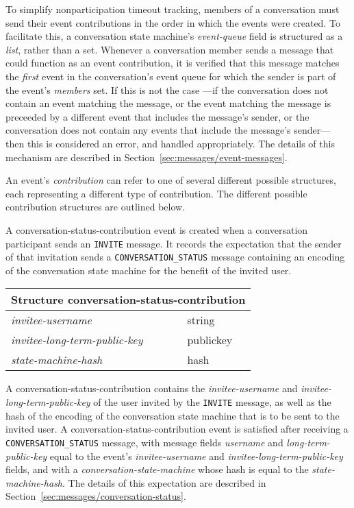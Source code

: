 \documentclass{article}
\def\npmessage#1{\texttt{#1}}
\def\field#1{\textit{#1}}
\def\smfield#1{\textsl{#1}}
\def\type#1{\textsf{#1}}
\newenvironment{struct}[1]{
\newcommand{\structfield}[2]{
\smfield{##1} & \type{##2} \\
\hline
}
\par
\vspace{-\medskipamount}
\hspace{2em minus 2em}\begin{tabular}{|l|l|}
\hline
\multicolumn{2}{|c|}{Structure \type{#1}} \\
\hline
\hline
}{
\end{tabular}
\vspace{-\medskipamount}
\par
}
\begin{document}
To simplify nonparticipation timeout tracking, members of a conversation must send their event contributions in the order in which the events were created.
To facilitate this, a conversation state machine's \smfield{event-queue} field is structured as a \emph{list}, rather than a set.
Whenever a conversation member sends a message that could function as an event contribution, it is verified that this message matches the \emph{first} event in the conversation's event queue for which the sender is part of the event's \smfield{members} set.
If this is not the case ---if the conversation does not contain an event matching the message, or the event matching the message is preceeded by a different event that includes the message's sender, or the conversation does not contain any events that include the message's sender--- then this is considered an error, and handled appropriately.
The details of this mechanism are described in Section~\ref{sec:messages/event-messages}.

An event's \smfield{contribution} can refer to one of several different possible structures, each representing a different type of contribution.
The different possible contribution structures are outlined below.


A \type{conversation-status-contribution} event is created when a conversation participant sends an \npmessage{INVITE} message.
It records the expectation that the sender of that invitation sends a \npmessage{CONVERSATION\_STATUS} message containing an encoding of the conversation state machine for the benefit of the invited user.
\begin{struct}{conversation-status-contribution}
\structfield{invitee-username}{string}
\structfield{invitee-long-term-public-key}{publickey}
\structfield{state-machine-hash}{hash}
\end{struct}
A \type{conversation-status-contribution} contains the \smfield{invitee-username} and \smfield{invitee-long-term-public-key} of the user invited by the \npmessage{INVITE} message, as well as the hash of the encoding of the conversation state machine that is to be sent to the invited user.
A \type{conversation-status-contribution} event is satisfied after receiving a \npmessage{CONVERSATION\_STATUS} message, with message fields \field{username} and \field{long-term-public-key} equal to the event's \smfield{invitee-username} and \smfield{invitee-long-term-public-key} fields, and with a \field{conversation-state-machine} whose hash is equal to the \smfield{state-machine-hash}.
The details of this expectation are described in Section~\ref{sec:messages/conversation-status}.
\end{document}
